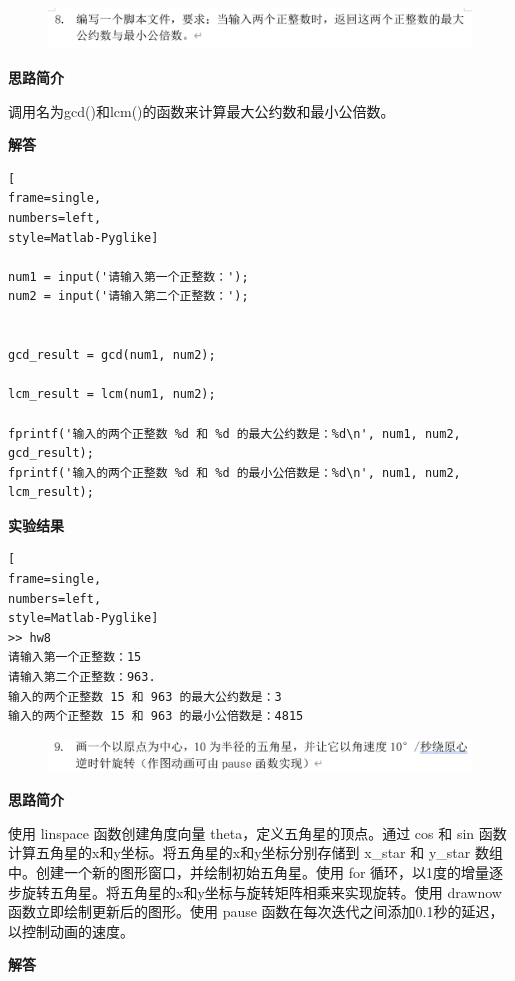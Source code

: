 \documentclass[12pt,UTF8]{ctexart}
\begin{document}
\clearpage




\begin{figure}
    \centering
    \includegraphics[width=1\linewidth]{++8.png}
    
    
\end{figure}

\par \textbf{思路简介}
\par 调用名为gcd()和lcm()的函数来计算最大公约数和最小公倍数。
\par \textbf{解答}

\begin{lstlisting}[
frame=single,
numbers=left,
style=Matlab-Pyglike]

num1 = input('请输入第一个正整数：');
num2 = input('请输入第二个正整数：');


gcd_result = gcd(num1, num2);

lcm_result = lcm(num1, num2);

fprintf('输入的两个正整数 %d 和 %d 的最大公约数是：%d\n', num1, num2, gcd_result);
fprintf('输入的两个正整数 %d 和 %d 的最小公倍数是：%d\n', num1, num2, lcm_result);

\end{lstlisting}


\par \textbf{实验结果}
\begin{lstlisting}[
frame=single,
numbers=left,
style=Matlab-Pyglike]
>> hw8
请输入第一个正整数：15
请输入第二个正整数：963.
输入的两个正整数 15 和 963 的最大公约数是：3
输入的两个正整数 15 和 963 的最小公倍数是：4815
\end{lstlisting}

\clearpage

\begin{figure}
    \centering
    \includegraphics[width=1\linewidth]{++9.png}
    
\end{figure}

\par \textbf{思路简介}
\par 使用 linspace 函数创建角度向量 theta，定义五角星的顶点。通过 cos 和 sin 函数计算五角星的x和y坐标。将五角星的x和y坐标分别存储到 x\_star 和 y\_star 数组中。创建一个新的图形窗口，并绘制初始五角星。使用 for 循环，以1度的增量逐步旋转五角星。将五角星的x和y坐标与旋转矩阵相乘来实现旋转。使用 drawnow 函数立即绘制更新后的图形。使用 pause 函数在每次迭代之间添加0.1秒的延迟，以控制动画的速度。
\par \textbf{解答}
\end{document}
